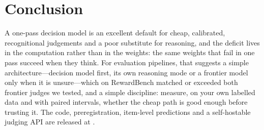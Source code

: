\section{Conclusion}
A one-pass decision model is an excellent default for cheap, calibrated, recognitional judgements and a poor substitute for reasoning, and the deficit lives in the computation rather than in the weights: the same weights that fail in one pass succeed when they think.
For evaluation pipelines, that suggests a simple architecture---decision model first, its own reasoning mode or a frontier model only when it is unsure---which on RewardBench matched or exceeded both frontier judges we tested, and a simple discipline: measure, on your own labelled data and with paired intervals, whether the cheap path is good enough before trusting it.
The code, preregistration, item-level predictions and a self-hostable judging API are released at \repourl.
